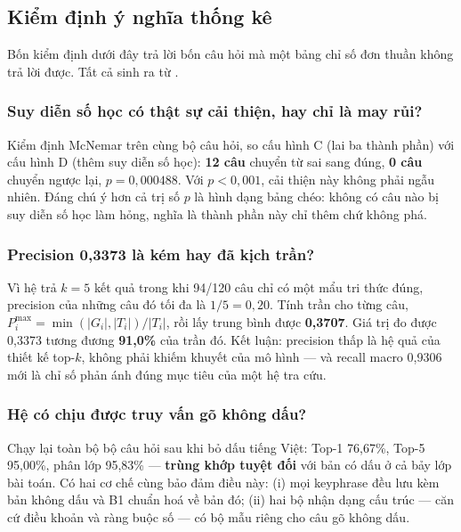 \subsection{Kiểm định ý nghĩa thống kê}
\label{sec:kiem-dinh}

Bốn kiểm định dưới đây trả lời bốn câu hỏi mà một bảng chỉ số đơn thuần không trả lời được.
Tất cả sinh ra từ .

\subsubsection{Suy diễn số học có thật sự cải thiện, hay chỉ là may rủi?}

Kiểm định McNemar trên cùng bộ câu hỏi, so cấu hình C (lai ba thành phần) với cấu hình D
(thêm suy diễn số học): \textbf{12 câu} chuyển từ sai sang đúng, \textbf{0 câu} chuyển ngược
lại, $p = 0{,}000488$. Với $p < 0{,}001$, cải thiện này không phải ngẫu nhiên. Đáng chú ý hơn
cả trị số $p$ là hình dạng bảng chéo: không có câu nào bị suy diễn số học làm hỏng, nghĩa là
thành phần này chỉ thêm chứ không phá.

\subsubsection{Precision 0,3373 là kém hay đã kịch trần?}

Vì hệ trả $k = 5$ kết quả trong khi 94/120 câu chỉ có một mẩu tri thức đúng, precision của
những câu đó tối đa là $1/5 = 0{,}20$. Tính trần cho từng câu,
$P_i^{\max} = \min(|G_i|, |T_i|)/|T_i|$, rồi lấy trung bình được \textbf{0,3707}. Giá trị đo
được 0,3373 tương đương \textbf{91,0\%} của trần đó. Kết luận: precision thấp là hệ quả của
thiết kế top-$k$, không phải khiếm khuyết của mô hình --- và recall macro 0,9306 mới là chỉ số
phản ánh đúng mục tiêu của một hệ tra cứu.

\subsubsection{Hệ có chịu được truy vấn gõ không dấu?}

Chạy lại toàn bộ bộ câu hỏi sau khi bỏ dấu tiếng Việt: Top-1 76,67\%, Top-5 95,00\%, phân lớp
95,83\% --- \textbf{trùng khớp tuyệt đối} với bản có dấu ở cả bảy lớp bài toán. Có hai cơ chế
cùng bảo đảm điều này: (i) mọi keyphrase đều lưu kèm bản không dấu và B1 chuẩn hoá về bản đó;
(ii) hai bộ nhận dạng cấu trúc --- căn cứ điều khoản và ràng buộc số --- có bộ mẫu riêng cho
câu gõ không dấu.

